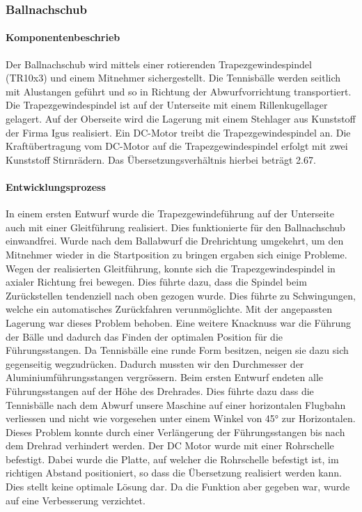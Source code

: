 \subsubsection{Ballnachschub}

\paragraph{Komponentenbeschrieb}

Der Ballnachschub wird mittels einer rotierenden Trapezgewindespindel (TR10x3) und einem Mitnehmer sichergestellt. Die Tennisbälle werden seitlich mit Alustangen geführt und so in Richtung der Abwurfvorrichtung transportiert. Die Trapezgewindespindel ist auf der Unterseite mit einem Rillenkugellager gelagert. Auf der Oberseite wird die Lagerung mit einem Stehlager aus Kunststoff der Firma Igus realisiert. Ein DC-Motor treibt die Trapezgewindespindel an. Die Kraftübertragung vom DC-Motor auf die Trapezgewindespindel erfolgt mit zwei Kunststoff Stirnrädern. Das Übersetzungsverhältnis hierbei beträgt 2.67. 

\paragraph{Entwicklungsprozess}

In einem ersten Entwurf wurde die Trapezgewindeführung auf der Unterseite auch mit einer Gleitführung realisiert. Dies funktionierte für den Ballnachschub einwandfrei. Wurde nach dem Ballabwurf die Drehrichtung umgekehrt, um den Mitnehmer wieder in die Startposition zu bringen ergaben sich einige Probleme. Wegen der realisierten Gleitführung, konnte sich die Trapezgewindespindel in axialer Richtung frei bewegen. Dies führte dazu, dass die Spindel beim Zurückstellen tendenziell nach oben gezogen wurde. Dies führte zu Schwingungen, welche ein automatisches Zurückfahren verunmöglichte. Mit der angepassten Lagerung war dieses Problem behoben. 
Eine weitere Knacknuss war die Führung der Bälle und dadurch das Finden der optimalen Position für die Führungsstangen. Da Tennisbälle eine runde Form besitzen, neigen sie dazu sich gegenseitig wegzudrücken. Dadurch mussten wir den Durchmesser der Aluminiumführungsstangen vergrössern. Beim ersten Entwurf endeten alle Führungsstangen auf der Höhe des Drehrades. Dies führte dazu dass die Tennisbälle nach dem Abwurf unsere Maschine auf einer horizontalen Flugbahn verliessen und nicht wie vorgesehen unter einem Winkel von 45° zur Horizontalen. Dieses Problem konnte durch einer Verlängerung der Führungsstangen bis nach dem Drehrad verhindert werden. 
Der DC Motor wurde mit einer Rohrschelle befestigt. Dabei wurde die Platte, auf welcher die Rohrschelle befestigt ist, im richtigen Abstand positioniert, so dass die Übersetzung realisiert werden kann. Dies stellt keine optimale Lösung dar. Da die Funktion aber gegeben war, wurde auf eine Verbesserung verzichtet. 
